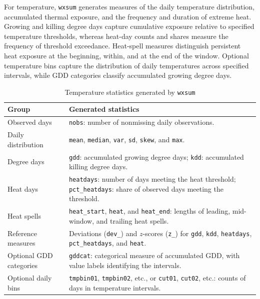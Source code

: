 For temperature, \texttt{wxsum} generates measures of the daily temperature distribution, accumulated thermal exposure, and the frequency and duration of extreme heat. Growing and killing degree days capture cumulative exposure relative to specified temperature thresholds, whereas heat-day counts and shares measure the frequency of threshold exceedance. Heat-spell measures distinguish persistent heat exposure at the beginning, within, and at the end of the window. Optional temperature bins capture the distribution of daily temperatures across specified intervals, while GDD categories classify accumulated growing degree days.

\begin{table}[htbp]
    \caption{Temperature statistics generated by \texttt{wxsum}}
    \label{tab:tempout}
    \begin{center}
        \begin{tabularx}{\textwidth}{>{\raggedright\arraybackslash}p{}>{\raggedright\arraybackslash}X}
            \hline
            Group & Generated statistics \\
            \hline
            Observed days & \texttt{nobs}: number of nonmissing daily observations. \\
            Daily distribution & \texttt{mean}, \texttt{median}, \texttt{var}, \texttt{sd}, \texttt{skew}, and \texttt{max}. \\
            Degree days & \texttt{gdd}: accumulated growing degree days; \texttt{kdd}: accumulated killing degree days. \\
            Heat days & \texttt{heatdays}: number of days meeting the heat threshold; \texttt{pct\_heatdays}: share of observed days meeting the threshold. \\
            Heat spells & \texttt{heat\_start}, \texttt{heat}, and \texttt{heat\_end}: lengths of leading, mid-window, and trailing heat spells. \\
            Reference measures & Deviations (\texttt{dev\_}) and $z$-scores (\texttt{z\_}) for \texttt{gdd}, \texttt{kdd}, \texttt{heatdays}, \texttt{pct\_heatdays}, and \texttt{heat}. \\
            Optional GDD categories & \texttt{gddcat}: categorical measure of accumulated GDD, with value labels identifying the intervals. \\
            Optional daily bins & \texttt{tmpbin01}, \texttt{tmpbin02}, etc., or \texttt{cut01}, \texttt{cut02}, etc.: counts of days in temperature intervals. \\
            \hline
        \end{tabularx}
    \end{center}
\end{table}

